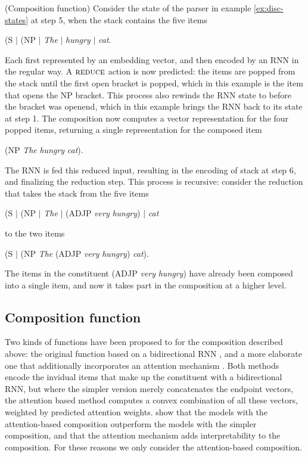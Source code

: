     \begin{example}{(Composition function)}
      Consider the state of the parser in example \ref{ex:disc-states} at step 5, when the stack contains the five items
      \begin{center}
        (S $\mid$ (NP $\mid$ \textit{The} $\mid$ \textit{hungry} $\mid$ \textit{cat}.
      \end{center}
      Each first represented by an embedding vector, and then encoded by an RNN in the regular way. A $\textsc{reduce}$ action is now predicted: the items are popped from the stack until the first open bracket is popped, which in this example is the item that opens the NP bracket. This process also rewinds the RNN state to before the bracket was openend, which in this example brings the RNN back to its state at step 1. The composition now computes a vector representation for the four popped items, returning a single representation for the composed item
      \begin{center}
        (NP \textit{The} \textit{hungry} \textit{cat}).
      \end{center}
      The RNN is fed this reduced input, resulting in the encoding of stack at step 6, and finalizing the reduction step. This process is recursive: consider the reduction that takes the stack from the five items
      \begin{center}
        (S $\mid$ (NP $\mid$ \textit{The} $\mid$ (ADJP \textit{very} \textit{hungry}) $\mid$ \textit{cat}
      \end{center}
      to the two items
      \begin{center}
        (S $\mid$ (NP \textit{The} (ADJP \textit{very} \textit{hungry}) \textit{cat}).
      \end{center}
      The items in the constituent (ADJP \textit{very} \textit{hungry}) have already been composed into a single item, and now it takes part in the composition at a higher level.
    \end{example}

  \subsection{Composition function}
    Two kinds of functions have been proposed to for the composition described above: the original function based on a bidirectional RNN \citep{dyer2016rnng}, and a more elaborate one that additionally incorporates an attention mechanism \citep{kuncoro2017syntax}. Both methods encode the invidual items that make up the constituent with a bidirectional RNN, but where the simpler version merely concatenates the endpoint vectors, the attention based method computes a convex combination of all these vectors, weighted by predicted attention weights. \citet{kuncoro2017syntax} show that the models with the attention-based composition outperform the models with the simpler composition, and that the attention mechanism adds interpretability to the composition. For these reasons we only consider the attention-based composition.

